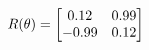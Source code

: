 \documentclass[preview]{standalone}
\begin{document}
\begin{align*}
\special{dvisvgm:raw <g id='unique000'>}R(\theta) = \begin{bmatrix}0.12 & 0.99\\-0.99 & 0.12\end{bmatrix}\special{dvisvgm:raw </g>}
\end{align*}
\end{document}
